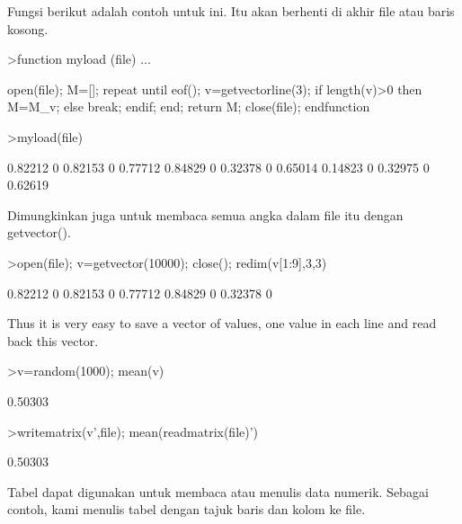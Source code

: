 \documentclass[a4paper,10pt]{article}
\begin{document}
\begin{eulernotebook}
\begin{eulercomment}
\begin{eulercomment}
\begin{eulercomment}
\begin{eulercomment}
\begin{eulercomment}
\begin{eulercomment}
\begin{eulercomment}
\begin{eulercomment}
\begin{eulercomment}
\begin{eulercomment}
\begin{eulercomment}
\begin{eulercomment}
\begin{eulercomment}
\begin{eulercomment}
\begin{eulercomment}
\begin{eulercomment}
\begin{eulercomment}
\begin{eulercomment}
\begin{eulercomment}
Fungsi berikut adalah contoh untuk ini. Itu akan berhenti di akhir
file atau baris kosong.
\end{eulercomment}
\begin{eulerprompt}
>function myload (file) ...
\end{eulerprompt}
\begin{eulerudf}
  open(file);
  M=[];
  repeat
     until eof();
     v=getvectorline(3);
     if length(v)>0 then M=M_v; else break; endif;
  end;
  return M;
  close(file);
  endfunction
\end{eulerudf}
\begin{eulerprompt}
>myload(file)
\end{eulerprompt}
\begin{euleroutput}
    0.82212         0   0.82153         0   0.77712 
    0.84829         0   0.32378         0   0.65014 
    0.14823         0   0.32975         0   0.62619 
\end{euleroutput}
\begin{eulercomment}
Dimungkinkan juga untuk membaca semua angka dalam file itu dengan
getvector().
\end{eulercomment}
\begin{eulerprompt}
>open(file); v=getvector(10000); close(); redim(v[1:9],3,3)
\end{eulerprompt}
\begin{euleroutput}
    0.82212         0   0.82153 
          0   0.77712   0.84829 
          0   0.32378         0 
\end{euleroutput}
\begin{eulercomment}
Thus it is very easy to save a vector of values, one value in each
line and read back this vector.
\end{eulercomment}
\begin{eulerprompt}
>v=random(1000); mean(v)
\end{eulerprompt}
\begin{euleroutput}
  0.50303
\end{euleroutput}
\begin{eulerprompt}
>writematrix(v',file); mean(readmatrix(file)')
\end{eulerprompt}
\begin{euleroutput}
  0.50303
\end{euleroutput}
\begin{eulercomment}
Tabel dapat digunakan untuk membaca atau menulis data numerik. Sebagai
contoh, kami menulis tabel dengan tajuk baris dan kolom ke file.

\end{eulercomment}
\end{eulercomment}
\end{eulercomment}
\end{eulercomment}
\end{eulercomment}
\end{eulercomment}
\end{eulercomment}
\end{eulercomment}
\end{eulercomment}
\end{eulercomment}
\end{eulercomment}
\end{eulercomment}
\end{eulercomment}
\end{eulercomment}
\end{eulercomment}
\end{eulercomment}
\end{eulercomment}
\end{eulercomment}
\end{eulercomment}
\end{eulernotebook}
\end{document}

